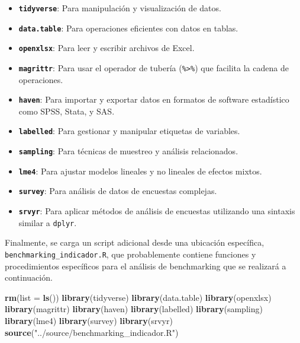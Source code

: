 \documentclass[
  12pt,
]{book}
\newenvironment{Shaded}{\begin{snugshade}}{\end{snugshade}}
\newcommand{\AttributeTok}[1]{\textcolor[rgb]{0.13,0.29,0.53}{#1}}
\newcommand{\FunctionTok}[1]{\textcolor[rgb]{0.13,0.29,0.53}{\textbf{#1}}}
\newcommand{\NormalTok}[1]{#1}
\newcommand{\StringTok}[1]{\textcolor[rgb]{0.31,0.60,0.02}{#1}}
\providecommand{\tightlist}{%
  \setlength{\itemsep}{0pt}\setlength{\parskip}{0pt}}
\begin{document}
\begin{itemize}
\tightlist
\item
  \textbf{\texttt{tidyverse}}: Para manipulación y visualización de datos.
\item
  \textbf{\texttt{data.table}}: Para operaciones eficientes con datos en tablas.
\item
  \textbf{\texttt{openxlsx}}: Para leer y escribir archivos de Excel.
\item
  \textbf{\texttt{magrittr}}: Para usar el operador de tubería (\texttt{\%\textgreater{}\%}) que facilita la cadena de operaciones.
\item
  \textbf{\texttt{haven}}: Para importar y exportar datos en formatos de software estadístico como SPSS, Stata, y SAS.
\item
  \textbf{\texttt{labelled}}: Para gestionar y manipular etiquetas de variables.
\item
  \textbf{\texttt{sampling}}: Para técnicas de muestreo y análisis relacionados.
\item
  \textbf{\texttt{lme4}}: Para ajustar modelos lineales y no lineales de efectos mixtos.
\item
  \textbf{\texttt{survey}}: Para análisis de datos de encuestas complejas.
\item
  \textbf{\texttt{srvyr}}: Para aplicar métodos de análisis de encuestas utilizando una sintaxis similar a \texttt{dplyr}.
\end{itemize}

Finalmente, se carga un script adicional desde una ubicación específica, \texttt{benchmarking\_indicador.R}, que probablemente contiene funciones y procedimientos específicos para el análisis de benchmarking que se realizará a continuación.

\begin{Shaded}
\begin{Highlighting}[]
\FunctionTok{rm}\NormalTok{(}\AttributeTok{list =} \FunctionTok{ls}\NormalTok{())}
\FunctionTok{library}\NormalTok{(tidyverse)}
\FunctionTok{library}\NormalTok{(data.table)}
\FunctionTok{library}\NormalTok{(openxlsx)}
\FunctionTok{library}\NormalTok{(magrittr)}
\FunctionTok{library}\NormalTok{(haven)}
\FunctionTok{library}\NormalTok{(labelled)}
\FunctionTok{library}\NormalTok{(sampling)}
\FunctionTok{library}\NormalTok{(lme4)}
\FunctionTok{library}\NormalTok{(survey)}
\FunctionTok{library}\NormalTok{(srvyr)}
\FunctionTok{source}\NormalTok{(}\StringTok{"../source/benchmarking\_indicador.R"}\NormalTok{)}
\end{Highlighting}
\end{Shaded}
\end{document}
